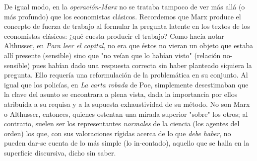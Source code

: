 \documentclass{book}
\begin{document}
De igual modo, en la \emph{operación-Marx} no se trataba tampoco de ver
más allá (o más profundo) que los economistas clásicos. Recordemos que
Marx produce el concepto de fuerza de trabajo al formular la pregunta
latente en los textos de los economistas clásicos: ¿qué cuesta producir
el trabajo? Como hacía notar Althusser, en \emph{Para leer el capital},
no era que éstos no vieran un objeto que estaba allí presente (sensible)
sino que "no veían que lo habían visto" (relación no-sensible) pues
habían dado una respuesta correcta sin haber planteado siquiera la
pregunta. Ello requería una reformulación de la problemática en su
conjunto. Al igual que los policías, en \emph{La carta robada} de Poe,
simplemente desestimaban que la clave del asunto se encontrara a plena
vista, dada la importancia por ellos atribuida a su requisa y a la
supuesta exhaustividad de su método. No son Marx o Althusser, entonces,
quienes ostentan una mirada superior "sobre" los otros; al contrario,
suelen ser los representantes \emph{normales} de la ciencia (los agentes
del orden) los que, con sus valoraciones rígidas acerca de lo que
\emph{debe haber}, no pueden dar-se cuenta de lo más simple (lo
in-contado), aquello que se halla en la superficie discursiva, dicho sin
saber.
\end{document}
